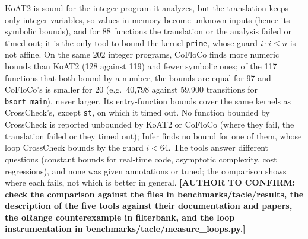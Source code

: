 \documentclass[oneside,english]{amsart}
\numberwithin{equation}{section}
\numberwithin{figure}{section}
\theoremstyle{plain}
\theoremstyle{definition}
\theoremstyle{plain}
\theoremstyle{remark}
\theoremstyle{plain}
\theoremstyle{definition}
\theoremstyle{plain}
\theoremstyle{remark}
\newcommand{\authortodo}[1]{\textbf{[AUTHOR TO CONFIRM: #1]}}
\begin{document}
KoAT2 is sound for the integer program it analyzes, but the translation keeps only integer variables, so values in memory become unknown inputs (hence its symbolic bounds), and for 88 functions the translation or the analysis failed or timed out; it is the only tool to bound the kernel \texttt{prime}, whose guard $i \cdot i \le n$ is not affine. On the same 202 integer programs, CoFloCo finds more numeric bounds than KoAT2 (128 against 119) and fewer symbolic ones; of the 117 functions that both bound by a number, the bounds are equal for 97 and CoFloCo's is smaller for 20 (e.g.\ 40{,}798 against 59{,}900 transitions for \texttt{bsort\_main}), never larger. Its entry-function bounds cover the same kernels as CrossCheck's, except \texttt{st}, on which it timed out. No function bounded by CrossCheck is reported unbounded by KoAT2 or CoFloCo (where they fail, the translation failed or they timed out); Infer finds no bound for one of them, whose loop CrossCheck bounds by the guard $i < 64$. The tools answer different questions (constant bounds for real-time code, asymptotic complexity, cost regressions), and none was given annotations or tuned; the comparison shows where each fails, not which is better in general. \authortodo{check the comparison against the files in benchmarks/tacle/results, the description of the five tools against their documentation and papers, the oRange counterexample in filterbank, and the loop instrumentation in benchmarks/tacle/measure\_loops.py.}
\end{document}
